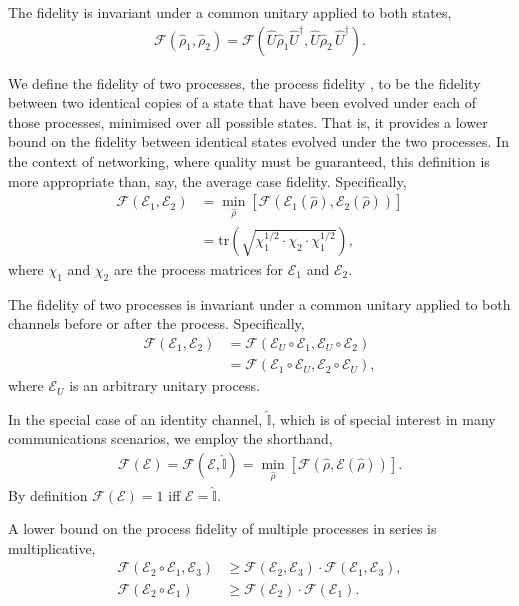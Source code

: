 \documentclass[aps,rmp,twocolumn,amsmath,amssymb,nofootinbib,superscriptaddress,longbibliography,floatfix,table-of-contents,eqsecnum]{revtex4-1}
\newcommand{\comment}[1]{{\color{blue}{\textbf{#1}}}}
\begin{document}
The fidelity is invariant under a common unitary applied to both states,
\begin{align}
\mathcal{F}(\hat\rho_1,\hat\rho_2) = \mathcal{F}(\hat{U}\hat\rho_1 \hat{U}^\dag,\hat{U} \hat\rho_2\,\hat{U}^\dag).
\end{align}

We define the fidelity of two processes, the process fidelity  \cite{bib:Gilchrist05}, to be the fidelity between two identical copies of a state that have been evolved under each of those processes, minimised over all possible states. That is, it provides a lower bound on the fidelity between identical states evolved under the two processes. In the context of networking, where quality must be guaranteed, this definition is more appropriate than, say, the average case fidelity. Specifically,
\begin{align}
\mathcal{F}(\mathcal{E}_1,\mathcal{E}_2) &= \min_{\hat\rho} \left[\mathcal{F}(\mathcal{E}_1(\hat\rho),\mathcal{E}_2(\hat\rho))\right] \nonumber \\
&= \text{tr}\left(\sqrt{\chi_1^{1/2}\cdot\chi_2\cdot\chi_1^{1/2}}\right),
\end{align}
\comment{CHECK THIS!} where $\chi_1$ and $\chi_2$ are the process matrices for $\mathcal{E}_1$ and $\mathcal{E}_2$.

The fidelity of two processes is invariant under a common unitary applied to both channels before or after the process. Specifically,
\begin{align}
\mathcal{F}(\mathcal{E}_1,\mathcal{E}_2) &= \mathcal{F}(\mathcal{E}_U\circ\mathcal{E}_1,\mathcal{E}_U\circ\mathcal{E}_2) \nonumber \\
&= \mathcal{F}(\mathcal{E}_1\circ \mathcal{E}_U,\mathcal{E}_2\circ \mathcal{E}_U),
\end{align}
where $\mathcal{E}_U$ is an arbitrary unitary process.

In the special case of an identity channel, $\hat{\mathbb{I}}$, which is of special interest in many communications scenarios, we employ the shorthand,
\begin{align}
\mathcal{F}(\mathcal{E}) = \mathcal{F}(\mathcal{E},\hat{\mathbb{I}}) = \min_{\hat\rho} \left[\mathcal{F}(\hat\rho,\mathcal{E}(\hat\rho))\right].
\end{align}
By definition \mbox{$\mathcal{F}(\mathcal{E})=1$} iff \mbox{$\mathcal{E}=\hat{\mathbb{I}}$}.

A lower bound on the process fidelity of multiple processes in series is multiplicative,
\begin{align}
\mathcal{F}(\mathcal{E}_2\circ\mathcal{E}_1,\mathcal{E}_3) &\geq \mathcal{F}(\mathcal{E}_2,\mathcal{E}_3)\cdot\mathcal{F}(\mathcal{E}_1,\mathcal{E}_3), \nonumber \\
\mathcal{F}(\mathcal{E}_2\circ\mathcal{E}_1) &\geq \mathcal{F}(\mathcal{E}_2)\cdot\mathcal{F}(\mathcal{E}_1).
\end{align}
\end{document}
